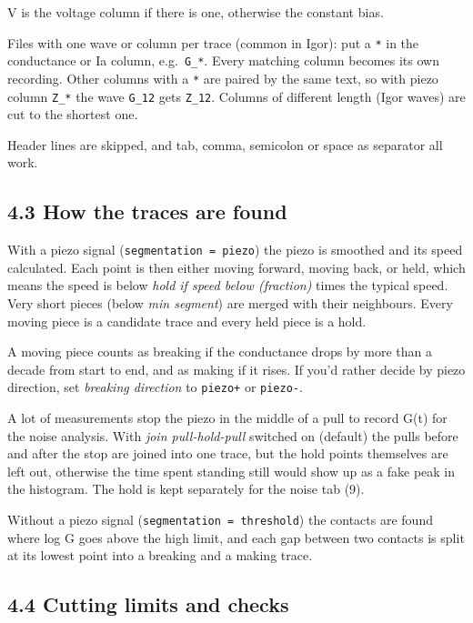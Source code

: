 \documentclass[
  11pt,
  a4paper,
]{article}
\begin{document}
V is the voltage column if there is one, otherwise the constant bias.

Files with one wave or column per trace (common in Igor): put a
\texttt{*} in the conductance or Ia column,
e.g.~\texttt{G\_\allowbreak{}*}. Every matching column becomes its own
recording. Other columns with a \texttt{*} are paired by the same text,
so with piezo column \texttt{Z\_\allowbreak{}*} the wave
\texttt{G\_\allowbreak{}12} gets \texttt{Z\_\allowbreak{}12}. Columns of
different length (Igor waves) are cut to the shortest one.

Header lines are skipped, and tab, comma, semicolon or space as
separator all work.

\hypertarget{how-the-traces-are-found}{%
\subsection{4.3 How the traces are
found}\label{how-the-traces-are-found}}

With a piezo signal (\texttt{segmentation = piezo}) the piezo is
smoothed and its speed calculated. Each point is then either moving
forward, moving back, or held, which means the speed is below \emph{hold
if speed below (fraction)} times the typical speed. Very short pieces
(below \emph{min segment}) are merged with their neighbours. Every
moving piece is a candidate trace and every held piece is a hold.

A moving piece counts as breaking if the conductance drops by more than
a decade from start to end, and as making if it rises. If you'd rather
decide by piezo direction, set \emph{breaking direction} to
\texttt{piezo+} or \texttt{piezo-}.

A lot of measurements stop the piezo in the middle of a pull to record
G(t) for the noise analysis. With \emph{join pull-hold-pull} switched on
(default) the pulls before and after the stop are joined into one trace,
but the hold points themselves are left out, otherwise the time spent
standing still would show up as a fake peak in the histogram. The hold
is kept separately for the noise tab (9).

Without a piezo signal (\texttt{segmentation = threshold}) the contacts
are found where log G goes above the high limit, and each gap between
two contacts is split at its lowest point into a breaking and a making
trace.

\hypertarget{cutting-limits-and-checks}{%
\subsection{4.4 Cutting limits and
checks}\label{cutting-limits-and-checks}}
\end{document}
